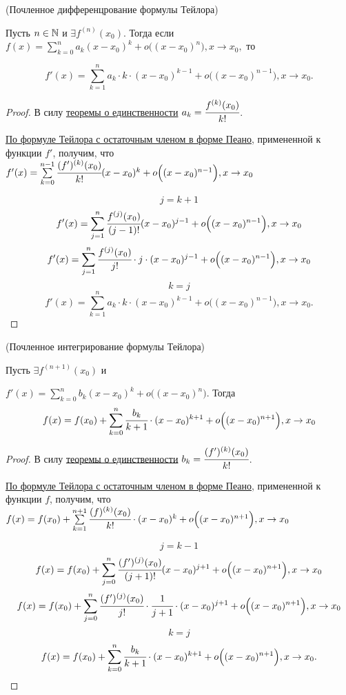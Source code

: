 \begin{theorem}
	\hypertarget{thrm5.17}{(Почленное дифференцрование формулы Тейлора)} Пусть $n\in \mathbb{N}$ и $\exists f^{(n)}(x_{0}).$ Тогда если $f(x) = \sum\limits_{k =0}^{n} a_{k}(x-x_{0})^{k} + o\Big((x-x_{0})^{n}\Big), x \to x_{0},$ то 
	
	$$f'(x) = \sum\limits_{k = 1}^{n} a_{k} \cdot k \cdot (x-x_{0})^{k-1} + o\Big((x-x_{0})^{n-1}\Big), x \to x_{0}.$$
\end{theorem}
\begin{proof}
	В силу \hyperlink{thrm5.16}{теоремы о единственности} $a_{k} = \cfrac{f^{(k)}(x_{0})}{k!}$.
	
	\hyperlink{thrm5.14}{По формуле Тейлора с остаточным членом в форме Пеано}, примененной к функции $f'$, получим, что $f'(x) = \sum\limits_{k = 0}^{n-1} \cfrac{(f')^{(k)}(x_{0})}{k!} (x-x_{0})^{k} + o\Big((x-x_{0})^{n-1}\Big), x \to x_{0}$
	
	$$
	j = k+1
	$$
	$$
	f'(x) = \sum\limits_{j = 1}^{n} \cfrac{f^{(j)}(x_{0})}{(j-1)!} (x-x_{0})^{j-1} + o\Big((x-x_{0})^{n-1}\Big), x \to x_{0}
	$$
	$$
	f'(x) = \sum\limits_{j = 1}^{n} \cfrac{f^{(j)}(x_{0})}{j!} \cdot j \cdot (x-x_{0})^{j-1} + o\Big((x-x_{0})^{n-1}\Big), x \to x_{0}
	$$
	$$
	k = j
	$$
	$$f'(x) = \sum\limits_{k = 1}^{n} a_{k} \cdot k \cdot (x-x_{0})^{k-1} + o\Big((x-x_{0})^{n-1}\Big), x \to x_{0}.$$
\end{proof}

\begin{theorem}
	\hypertarget{thrm5.17}{(Почленное интегрирование формулы Тейлора)} Пусть $\exists f^{(n+1)}(x_{0})$ и 
	
	$f'(x) = \sum\limits_{k = 0}^{n} b_{k}(x-x_{0})^{k} + o \Big((x-x_{0})^{n}\Big)$. Тогда 
	$$f(x) = f(x_{0}) + \sum\limits_{k=0}^{n} \cfrac{b_{k}}{k+1} \cdot (x-x_{0})^{k+1} + o\Big((x-x_{0})^{n+1}\Big), x\to x_{0}$$
\end{theorem}
\begin{proof}
	В силу \hyperlink{thrm5.16}{теоремы о единственности} $b_{k} = \cfrac{(f')^{(k)}(x_{0})}{k!}$.
	
	\hyperlink{thrm5.14}{По формуле Тейлора с остаточным членом в форме Пеано}, примененной к функции $f$, получим, что $f(x) = f(x_{0})+\sum\limits_{k = 1}^{n+1} \cfrac{(f)^{(k)}(x_{0})}{k!} \cdot (x-x_{0})^{k} + o\Big((x-x_{0})^{n+1}\Big), x \to x_{0}$
	
	$$
	j = k-1
	$$
	$$
	f(x) =f(x_{0}) +  \sum\limits_{j = 0}^{n} \cfrac{(f')^{(j)}(x_{0})}{(j+1)!} (x-x_{0})^{j+1} + o\Big((x-x_{0})^{n+1}\Big), x \to x_{0}
	$$
	$$
	f(x) = f(x_{0}) + \sum\limits_{j = 0}^{n} \cfrac{(f')^{(j)}(x_{0})}{j!} \cdot \cfrac{1}{j+1} \cdot (x-x_{0})^{j+1} + o\Big((x-x_{0})^{n+1}\Big), x \to x_{0}
	$$
	$$
	k = j
	$$
	$$f(x) = f(x_{0}) +  \sum\limits_{k = 0}^{n} \cfrac{b_{k}}{k + 1} \cdot (x-x_{0})^{k+1} + o\Big((x-x_{0})^{n+1}\Big), x \to x_{0}.$$
\end{proof}

